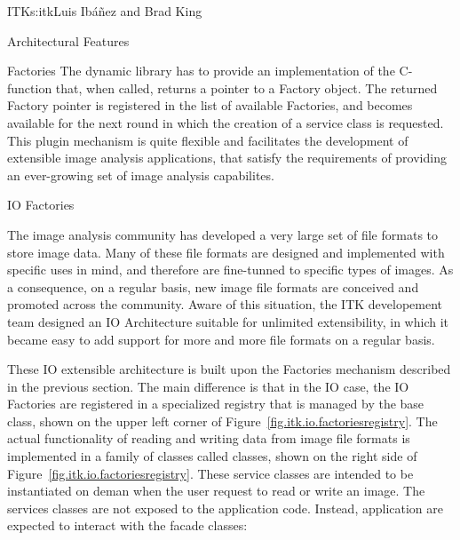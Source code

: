 \begin{aosachapter}{ITK}{s:itk}{Luis Ib\'{a}\~{n}ez and Brad King}
\begin{aosasect1}{Architectural Features}
\begin{aosasect2}{Factories}
The dynamic library has to provide an implementation of the 
C-function that, when called, returns a pointer to a Factory object. The
returned Factory pointer is registered in the list of available Factories, and
becomes available for the next round in which the creation of a service class
is requested. This plugin mechanism is quite flexible and facilitates the
development of extensible image analysis applications, that satisfy the
requirements of providing an ever-growing set of image analysis capabilites.

\end{aosasect2}

\begin{aosasect2}{IO Factories}

The image analysis community has developed a very large set of file formats to
store image data. Many of these file formats are designed and implemented with
specific uses in mind, and therefore are fine-tunned to specific types of
images. As a consequence, on a regular basis, new image file formats are
conceived and promoted across the community. Aware of this situation, the ITK
developement team designed an IO Architecture suitable for unlimited
extensibility, in which it became easy to add support for more and more file
formats on a regular basis.



These IO extensible architecture is built upon the Factories mechanism
described in the previous section. The main difference is that in the IO case,
the IO Factories are registered in a specialized registry that is managed by
the  base class, shown on the upper left corner of
Figure~\ref{fig.itk.io.factoriesregistry}. The actual functionality of reading
and writing data from image file formats is implemented in a family of classes
called  classes, shown on the right side of
Figure~\ref{fig.itk.io.factoriesregistry}. These service classes are intended
to be instantiated on deman when the user request to read or write an image.
The services classes are not exposed to the application code. Instead,
application are expected to interact with the facade classes:

\begin{aosaitemize}
\item {}
\item {}
\end{aosaitemize}


\end{aosasect2}
\end{aosasect1}
\end{aosachapter}
